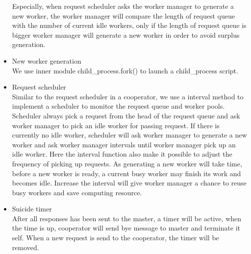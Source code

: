 \documentclass[JIP]{ipsj}
\begin{document}
\begin{itemize}
	Especially, when request scheduler asks the worker manager to generate a new worker, the worker manager will compare the length of request queue with the number of current idle workers, only if the length of request queue is bigger worker manager will generate a new worker in order to avoid surplus generation.

	\item New worker generation\\
	We use inner module child\_process.fork() to launch a child\_process script.

	\item Request scheduler\\
	Similar to the request scheduler in a cooperator, we use a interval method to implement a scheduler to monitor the request queue and worker pools. Scheduler always pick a request from the head of the request queue and ask worker manager to pick an idle worker for passing request. If there is currently no idle worker, scheduler will ask worker manager to generate a new worker and ask worker manager intervals until worker manager pick up an idle worker. Here the interval function also make it possible to adjust the frequency of picking up requests. As generating a new worker will take time, before a new worker is ready, a current busy worker may finish its work and becomes idle. Increase the interval will give worker manager a chance to reuse busy workers and save computing resource.

	\item Suicide timer\\
	After all responses has been sent to the master, a timer will be active, when the time is up, cooperator will send bye message to master and terminate it self.
	When a new request is send to the cooperator, the timer will be removed.


\end{itemize}
\end{document}
